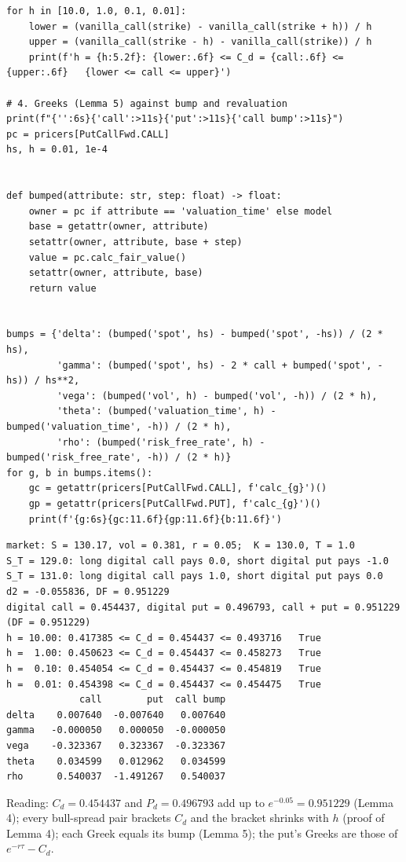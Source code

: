 \documentclass[11pt,a4paper]{article}
\begin{document}
\begin{lstlisting}[style=pysmall]
for h in [10.0, 1.0, 0.1, 0.01]:
    lower = (vanilla_call(strike) - vanilla_call(strike + h)) / h
    upper = (vanilla_call(strike - h) - vanilla_call(strike)) / h
    print(f'h = {h:5.2f}: {lower:.6f} <= C_d = {call:.6f} <= {upper:.6f}   {lower <= call <= upper}')

# 4. Greeks (Lemma 5) against bump and revaluation
print(f"{'':6s}{'call':>11s}{'put':>11s}{'call bump':>11s}")
pc = pricers[PutCallFwd.CALL]
hs, h = 0.01, 1e-4


def bumped(attribute: str, step: float) -> float:
    owner = pc if attribute == 'valuation_time' else model
    base = getattr(owner, attribute)
    setattr(owner, attribute, base + step)
    value = pc.calc_fair_value()
    setattr(owner, attribute, base)
    return value


bumps = {'delta': (bumped('spot', hs) - bumped('spot', -hs)) / (2 * hs),
         'gamma': (bumped('spot', hs) - 2 * call + bumped('spot', -hs)) / hs**2,
         'vega': (bumped('vol', h) - bumped('vol', -h)) / (2 * h),
         'theta': (bumped('valuation_time', h) - bumped('valuation_time', -h)) / (2 * h),
         'rho': (bumped('risk_free_rate', h) - bumped('risk_free_rate', -h)) / (2 * h)}
for g, b in bumps.items():
    gc = getattr(pricers[PutCallFwd.CALL], f'calc_{g}')()
    gp = getattr(pricers[PutCallFwd.PUT], f'calc_{g}')()
    print(f'{g:6s}{gc:11.6f}{gp:11.6f}{b:11.6f}')
\end{lstlisting}
\begin{lstlisting}[style=out]
market: S = 130.17, vol = 0.381, r = 0.05;  K = 130.0, T = 1.0
S_T = 129.0: long digital call pays 0.0, short digital put pays -1.0
S_T = 131.0: long digital call pays 1.0, short digital put pays 0.0
d2 = -0.055836, DF = 0.951229
digital call = 0.454437, digital put = 0.496793, call + put = 0.951229 (DF = 0.951229)
h = 10.00: 0.417385 <= C_d = 0.454437 <= 0.493716   True
h =  1.00: 0.450623 <= C_d = 0.454437 <= 0.458273   True
h =  0.10: 0.454054 <= C_d = 0.454437 <= 0.454819   True
h =  0.01: 0.454398 <= C_d = 0.454437 <= 0.454475   True
             call        put  call bump
delta    0.007640  -0.007640   0.007640
gamma   -0.000050   0.000050  -0.000050
vega    -0.323367   0.323367  -0.323367
theta    0.034599   0.012962   0.034599
rho      0.540037  -1.491267   0.540037
\end{lstlisting}
\noindent Reading: $C_d=0.454437$ and $P_d=0.496793$ add up to $e^{-0.05}=0.951229$ (Lemma 4); every bull-spread pair brackets $C_d$ and the bracket shrinks with $h$ (proof of Lemma 4); each Greek equals its bump (Lemma 5); the put's Greeks are those of $e^{-r\tau}-C_d$.
\end{document}
